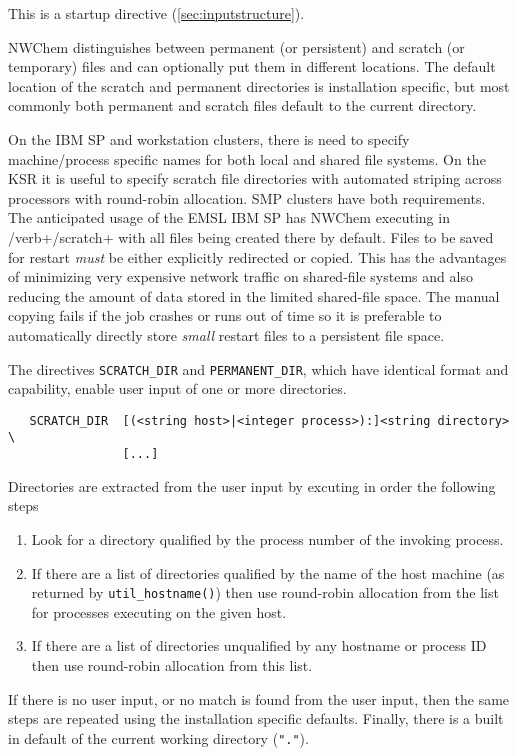 This is a startup directive (\ref{sec:inputstructure}).

NWChem distinguishes between permanent (or persistent) and scratch (or
temporary) files and can optionally put them in different locations.
The default location of the scratch and permanent directories is
installation specific, but most commonly both permanent and scratch
files default to the current directory.

On the IBM SP and workstation clusters, there is need to specify
machine/process specific names for both local and shared file systems.
On the KSR it is useful to specify scratch file directories with
automated striping across processors with round-robin allocation.  SMP
clusters have both requirements.  The anticipated usage of the EMSL
IBM SP has NWChem executing in /verb+/scratch+ with all files
being created there by default.  Files to be saved for restart {\em
  must} be either explicitly redirected or copied.  This has the
advantages of minimizing very expensive network traffic on shared-file
systems and also reducing the amount of data stored in the limited
shared-file space.  The manual copying fails if the job crashes or
runs out of time so it is preferable to automatically directly store
{\em small} restart files to a persistent file space.

The directives \verb+SCRATCH_DIR+ and \verb+PERMANENT_DIR+, which have
identical format and capability, enable user input of one or more
directories.

\begin{verbatim}
   SCRATCH_DIR  [(<string host>|<integer process>):]<string directory> \ 
                [...]
\end{verbatim}

Directories are extracted from the user input by excuting in order the
following steps
\begin{enumerate}
\item Look for a directory qualified by the process number of the
  invoking process.
\item If there are a list of directories qualified by the name of the
  host machine (as returned by \verb+util_hostname()+) then use
  round-robin allocation from the list for processes executing on the
  given host.
\item If there are a list of directories unqualified by any hostname
  or process ID then use round-robin allocation from this list.
\end{enumerate}
If there is no user input, or no match is found from the user input,
then the same steps are repeated using the installation specific
defaults.  Finally, there is a built in default of the current working
directory (\verb+"."+).


